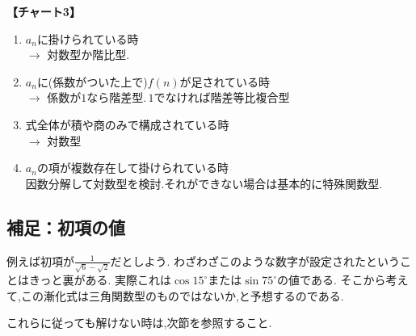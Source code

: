     \noindent \textbf{【チャート3】}
    \begin{enumerate}
      \item $a_n$に掛けられている時\\
            $\rightarrow$ 対数型か階比型.
      \item $a_n$に(係数がついた上で)$f(n)$が足されている時\\
            $\rightarrow$ 係数が$1$なら階差型.\,$1$でなければ階差等比複合型
      \item 式全体が積や商のみで構成されている時\\
            $\rightarrow$ 対数型
      \item $a_n$の項が複数存在して掛けられている時\\
            因数分解して対数型を検討.それができない場合は基本的に特殊関数型.
    \end{enumerate}
    \subsection{補足：初項の値}
      例えば初項が$\displaystyle \frac{1}{\sqrt{6}-\sqrt{2}}$だとしよう.
      わざわざこのような数字が設定されたということはきっと裏がある.
      実際これは$\cos 15^\circ$または$\sin 75^\circ$の値である.
      そこから考えて,この漸化式は三角関数型のものではないか,と予想するのである.
    
    これらに従っても解けない時は,次節を参照すること.
 
